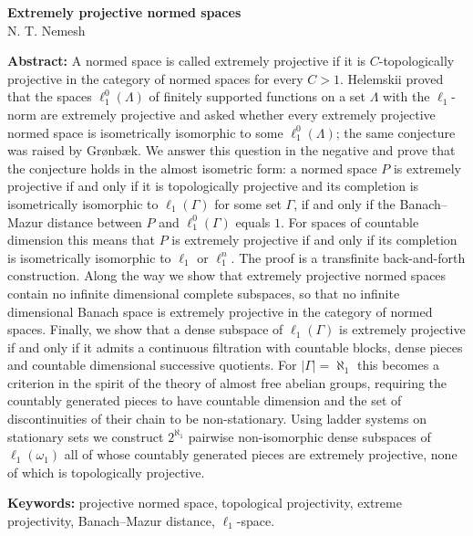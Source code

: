 \documentclass[12pt]{article}
\newcommand{\lo}[1]{\ell_1^0(#1)}
\newcommand{\ellone}[1]{\ell_1(#1)}
\begin{document}
\begin{center}
    \Large \textbf{Extremely projective normed spaces}\\[0.5cm]
    \small {N. T. Nemesh}\\[0.5cm]
\end{center}

\thispagestyle{empty}

\medskip
\textbf{Abstract:} A normed space is called extremely projective if it is
$C$-topologically projective in the category of normed spaces for every $C>1$.
Helemskii proved that the spaces $\lo{\Lambda}$ of finitely supported functions
on a set $\Lambda$ with the $\ell_1$-norm are extremely projective and asked
whether every extremely projective normed space is isometrically isomorphic to
some $\lo{\Lambda}$; the same conjecture was raised by Gr{\o}nb{\ae}k. We answer
this question in the negative and prove that the conjecture holds in the
almost isometric form: a normed space $P$ is extremely projective if and only
if it is topologically projective and its completion is isometrically
isomorphic to $\ellone{\Gamma}$ for some set $\Gamma$, if and only if the
Banach--Mazur distance between $P$ and $\lo{\Gamma}$ equals $1$. For spaces of
countable dimension this means that $P$ is extremely projective if and only
if its completion is isometrically isomorphic to $\ell_1$ or $\ell_1^n$. The
proof is a transfinite back-and-forth construction. Along the way we show that
extremely projective normed spaces contain no infinite dimensional complete
subspaces, so that no infinite dimensional Banach space is extremely
projective in the category of normed spaces. Finally, we show that a dense
subspace of $\ellone{\Gamma}$ is extremely projective if and only if it
admits a continuous filtration with countable blocks, dense pieces and
countable dimensional successive quotients. For $|\Gamma|=\aleph_1$ this
becomes a criterion in the spirit of the theory of almost free abelian
groups, requiring the countably generated pieces to have countable dimension
and the set of discontinuities of their chain to be non-stationary. Using
ladder systems on stationary sets we construct $2^{\aleph_1}$ pairwise
non-isomorphic dense subspaces of $\ellone{\omega_1}$ all of whose countably
generated pieces are extremely projective, none of which is topologically
projective.
\medskip

\textbf{Keywords:} projective normed space, topological projectivity, extreme
projectivity, Banach--Mazur distance, $\ell_1$-space.

\bigskip
\end{document}

